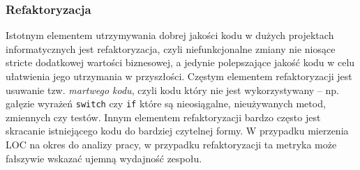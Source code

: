 \subsubsection*{Refaktoryzacja}
Istotnym elementem utrzymywania dobrej jakości kodu w dużych projektach informatycznych jest refaktoryzacja, czyli niefunkcjonalne zmiany nie niosące stricte dodatkowej wartości biznesowej,
a jedynie polepszające jakość kodu w celu ułatwienia jego utrzymania w przyszłości.
Częstym elementem refaktoryzacji jest usuwanie tzw. \textit{martwego kodu}, czyli kodu który nie jest wykorzystywany -- np. gałęzie wyrażeń \texttt{switch} czy \texttt{if} które są nieosiągalne, nieużywanych metod, zmiennych czy testów.
Innym elementem refaktoryzacji bardzo często jest skracanie istniejącego kodu do bardziej czytelnej formy.
W przypadku mierzenia LOC na okres do analizy pracy, w przypadku refaktoryzacji ta metryka może fałszywie wskazać ujemną wydajność zespołu.


